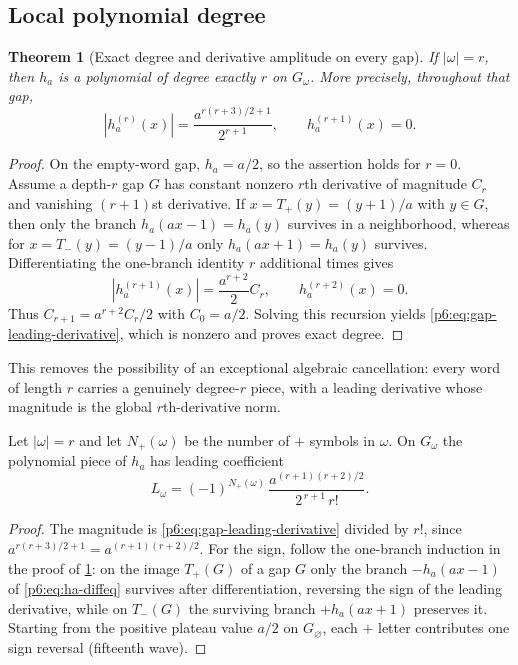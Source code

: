 \documentclass[11pt,oneside]{article}
\numberwithin{equation}{section}
\newtheorem{theorem}{Theorem}[section]
\theoremstyle{definition}
\theoremstyle{remark}
\begin{document}
\subsection{Local polynomial degree}

\begin{theorem}[Exact degree and derivative amplitude on every gap]
\label{p6:prop:polynomial-gap}
If $|\omega|=r$, then $h_a$ is a polynomial of degree exactly $r$ on
$G_\omega$.  More precisely, throughout that gap,
\begin{equation}\label{p6:eq:gap-leading-derivative}
 \left|h_a^{(r)}(x)\right|
 =\frac{a^{r(r+3)/2+1}}{2^{r+1}},
 \qquad h_a^{(r+1)}(x)=0.
\end{equation}
\end{theorem}

\begin{proof}
On the empty-word gap, $h_a=a/2$, so the assertion holds for $r=0$.
Assume a depth-$r$ gap $G$ has constant nonzero $r$th derivative of magnitude
$C_r$ and vanishing $(r+1)$st derivative.  If $x=T_+(y)=(y+1)/a$ with $y\in G$,
then only the branch $h_a(ax-1)=h_a(y)$ survives in a neighborhood, whereas for
$x=T_-(y)=(y-1)/a$ only $h_a(ax+1)=h_a(y)$ survives.  Differentiating the
one-branch identity $r$ additional times gives
\[
 |h_a^{(r+1)}(x)|=\frac{a^{r+2}}2 C_r,
 \qquad h_a^{(r+2)}(x)=0.
\]
Thus $C_{r+1}=a^{r+2}C_r/2$ with $C_0=a/2$.  Solving this recursion yields
\eqref{p6:eq:gap-leading-derivative}, which is nonzero and proves exact degree.
\end{proof}

This removes the possibility of an exceptional algebraic cancellation: every
word of length $r$ carries a genuinely degree-$r$ piece, with a leading
derivative whose magnitude is the global $r$th-derivative norm.

\begin{corollary}\label{p6:cor:signed-leading}
Let $|\omega|=r$ and let $N_+(\omega)$ be the number of $+$ symbols in
$\omega$.  On $G_\omega$ the polynomial piece of $h_a$ has leading coefficient
\begin{equation}\label{p6:eq:signed-leading}
 L_\omega=(-1)^{N_+(\omega)}\,
 \frac{a^{(r+1)(r+2)/2}}{2^{\,r+1}\,r!}.
\end{equation}
\end{corollary}

\begin{proof}
The magnitude is \eqref{p6:eq:gap-leading-derivative} divided by $r!$, since
$a^{r(r+3)/2+1}=a^{(r+1)(r+2)/2}$.  For the sign, follow the one-branch
induction in the proof of \cref{p6:prop:polynomial-gap}: on the image
$T_+(G)$ of a gap $G$ only the branch $-h_a(ax-1)$ of
\eqref{p6:eq:ha-diffeq} survives after differentiation, reversing the sign of
the leading derivative, while on $T_-(G)$ the surviving branch $+h_a(ax+1)$
preserves it.  Starting from the positive plateau value $a/2$ on
$G_\varnothing$, each $+$ letter contributes one sign reversal (fifteenth
wave).
\end{proof}
\end{document}

